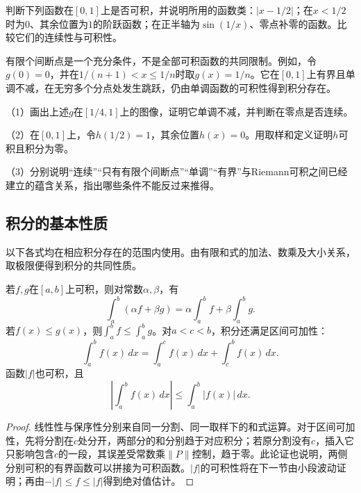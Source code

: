 \begin{example}
判断下列函数在\([0,1]\)上是否可积，并说明所用的函数类：\(|x-1/2|\)；在\(x<1/2\)时为\(0\)、其余位置为\(1\)的阶跃函数；在正半轴为\(\sin(1/x)\)、零点补零的函数。比较它们的连续性与可积性。
\end{example}

有限个间断点是一个充分条件，不是全部可积函数的共同限制。例如，令\(g(0)=0\)，并在\(1/(n+1)<x\le1/n\)时取\(g(x)=1/n\)。它在\([0,1]\)上有界且单调不减，在无穷多个分点处发生跳跃，仍由单调函数的可积性得到积分存在。

\begin{exercise}
\mbox{}\par\nobreak

（1）画出上述\(g\)在\([1/4,1]\)上的图像，证明它单调不减，并判断在零点是否连续。

（2）在\([0,1]\)上，令\(h(1/2)=1\)，其余位置\(h(x)=0\)。用取样和定义证明\(h\)可积且积分为零。

（3）分别说明“连续”“只有有限个间断点”“单调”“有界”与Riemann可积之间已经建立的蕴含关系，指出哪些条件不能反过来推得。
\end{exercise}

\subsection{积分的基本性质}

以下各式均在相应积分存在的范围内使用。由有限和式的加法、数乘及大小关系，取极限便得到积分的共同性质。

\begin{theorem}\label{thm:calculus-integral-properties}
若\(f,g\)在\([a,b]\)上可积，则对常数\(\alpha,\beta\)，有
\begin{equation*}
 \int_a^b(\alpha f+\beta g)=\alpha\int_a^b f+\beta\int_a^b g.
\end{equation*}
若\(f(x)\le g(x)\)，则\(\int_a^b f\le\int_a^b g\)。对\(a<c<b\)，积分还满足区间可加性：
\begin{equation}\label{eq:calculus-integral-additivity}
 \int_a^b f(x)\,dx=\int_a^c f(x)\,dx+\int_c^b f(x)\,dx.
\end{equation}
函数\(|f|\)也可积，且
\begin{equation}\label{eq:calculus-integral-absolute-bound}
 \left|\int_a^b f(x)\,dx\right|\le\int_a^b|f(x)|\,dx.
\end{equation}
\end{theorem}

\begin{proof}
线性性与保序性分别来自同一分割、同一取样下的和式运算。对于区间可加性，先将分割在\(c\)处分开，两部分的和分别趋于对应积分；若原分割没有\(c\)，插入它只影响包含\(c\)的一段，其误差受常数乘\(\|P\|\)控制，趋于零。此论证也说明，两侧分别可积的有界函数可以拼接为可积函数。\(|f|\)的可积性将在下一节由小段波动证明；再由\(-|f|\le f\le|f|\)得到绝对值估计。
\end{proof}

